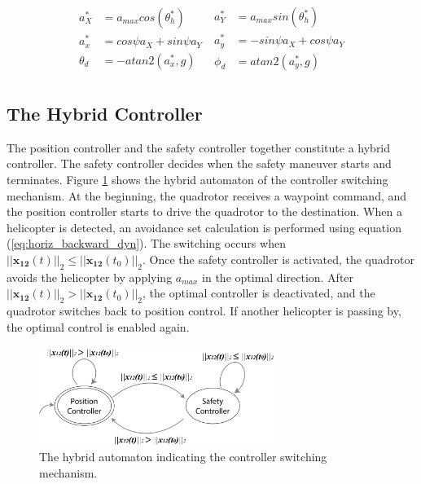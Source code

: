 \documentclass[journal,11pt,onecolumn,draftclsnofoot,]{IEEEtran}
\begin{document}
\begin{equation}
\label{eq:horiz_u_conversion}
\begin{aligned}
a_X^* &= a_{max}cos(\theta_h^*) \\
a_x^* &= cos\psi a_X + sin\psi a_Y \;\\
\theta_d &= -atan2(a_x^*,g) \\
\end{aligned}
\begin{aligned}
a_Y^* &= a_{max}sin(\theta_h^*) \\
a_y^* &= -sin\psi a_X + cos\psi a_Y \\
\phi_d &= atan2(a_y^*,g) \\
\end{aligned}
\end{equation}

\subsection{\textbf{The Hybrid Controller}}

The position controller and the safety controller together constitute a hybrid controller. The safety controller decides when the safety maneuver starts and terminates. Figure \ref{fig:hybrid_automaton} shows the hybrid automaton of the controller switching mechanism. At the beginning, the quadrotor receives a waypoint command, and the position controller starts to drive the quadrotor to the destination. When a helicopter is detected, an avoidance set calculation is performed using equation (\ref{eq:horiz_backward_dyn}). The switching occurs when $||\boldsymbol{x_{12}}(t)||_2 \le ||\boldsymbol{x_{12}}(t_0)||_2$. Once the safety controller is activated, the quadrotor avoids the helicopter by applying $a_{max}$ in the optimal direction. After $||\boldsymbol{x_{12}}(t)||_2 > ||\boldsymbol{x_{12}}(t_0)||_2$, the optimal controller is deactivated, and the quadrotor switches back to position control. If another helicopter is passing by, the optimal control is enabled again.

\begin{figure}
\centering
\includegraphics[width=3in]{hybrid_automaton}
\caption{The hybrid automaton indicating the controller switching mechanism.}
\label{fig:hybrid_automaton}
\end{figure}
\end{document}
